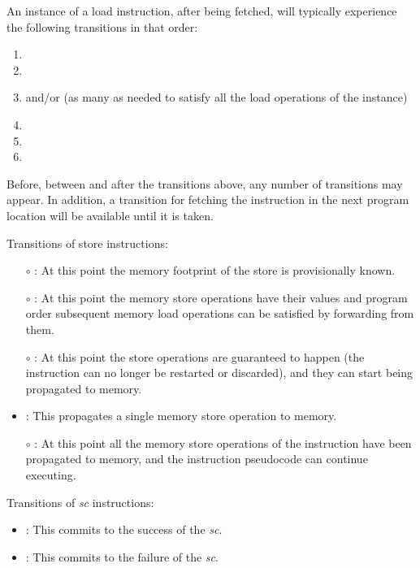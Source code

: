 \begin{commentary}
An instance of a load instruction, after being fetched, will typically experience the following transitions in that order:
\begin{enumerate}
\item {}
\item {}
\item {} and/or  (as many as needed to satisfy all the load operations of the instance)
\item {}
\item {}
\item {}
\end{enumerate}
Before, between and after the transitions above, any number of  transitions may appear.
In addition, a  transition for fetching the instruction in the next program location will be available until it is taken.
\end{commentary}


\noindent Transitions of store instructions:
\begin{itemize}
\item[$\circ$] : At this point the memory footprint of the store is provisionally known.
\item[$\circ$] : At this point the memory store operations have their values and program order subsequent memory load operations can be satisfied by forwarding from them.
\item[$\circ$] : At this point the store operations are guaranteed to happen (the instruction can no longer be restarted or discarded), and they can start being propagated to memory.
\item {}: This propagates a single memory store operation to memory.
\item[$\circ$] : At this point all the memory store operations of the instruction have been propagated to memory, and the instruction pseudocode can continue executing.
\end{itemize}

\noindent Transitions of {\em  sc} instructions:
\begin{itemize}
\item {}: This commits to the success of the {\em sc}.
\item {}: This commits to the failure of the {\em sc}.
\end{itemize}

